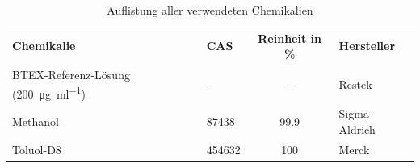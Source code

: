 \begin{table}[htbp]
    \centering
    \caption{Auflistung aller verwendeten Chemikalien}
    \label{tab:chemikalien}
    \begin{adjustbox}{width=0.4836\textwidth}
        \begin{tabular}{llS[fixed-exponent=0, round-mode=places, round-precision=3]l}
            \toprule
            {Chemikalie} & {CAS} & {Reinheit in \%} & {Hersteller} \\
            \midrule
            BTEX-Referenz-Lösung (\SI{200}{\micro\gram\per\milli\litre}) & --     & {--} & Restek        \\
            Methanol                                                     & 87438  & 99.9 & Sigma-Aldrich \\
            Toluol-D8                                                    & 454632 & 100  & Merck         \\
            \bottomrule
        \end{tabular}
    \end{adjustbox}
\end{table}